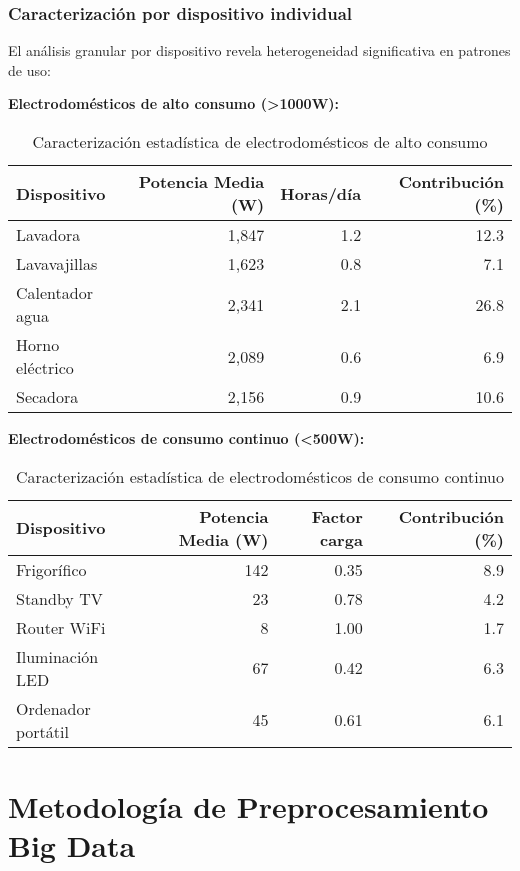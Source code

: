 \subsubsection{Caracterización por dispositivo individual}

El análisis granular por dispositivo revela heterogeneidad significativa en patrones de uso:

\textbf{Electrodomésticos de alto consumo (>1000W):}
\begin{table}[H]
\centering
\caption{Caracterización estadística de electrodomésticos de alto consumo}
\begin{tabular}{lrrr}
\toprule
\textbf{Dispositivo} & \textbf{Potencia Media (W)} & \textbf{Horas/día} & \textbf{Contribución (\%)} \\
\midrule
Lavadora & 1,847 & 1.2 & 12.3 \\
Lavavajillas & 1,623 & 0.8 & 7.1 \\
Calentador agua & 2,341 & 2.1 & 26.8 \\
Horno eléctrico & 2,089 & 0.6 & 6.9 \\
Secadora & 2,156 & 0.9 & 10.6 \\
\bottomrule
\end{tabular}
\label{tab:alto_consumo}
\end{table}

\textbf{Electrodomésticos de consumo continuo (<500W):}
\begin{table}[H]
\centering
\caption{Caracterización estadística de electrodomésticos de consumo continuo}
\begin{tabular}{lrrr}
\toprule
\textbf{Dispositivo} & \textbf{Potencia Media (W)} & \textbf{Factor carga} & \textbf{Contribución (\%)} \\
\midrule
Frigorífico & 142 & 0.35 & 8.9 \\
Standby TV & 23 & 0.78 & 4.2 \\
Router WiFi & 8 & 1.00 & 1.7 \\
Iluminación LED & 67 & 0.42 & 6.3 \\
Ordenador portátil & 45 & 0.61 & 6.1 \\
\bottomrule
\end{tabular}
\label{tab:consumo_continuo}
\end{table}

\section{Metodología de Preprocesamiento Big Data}

